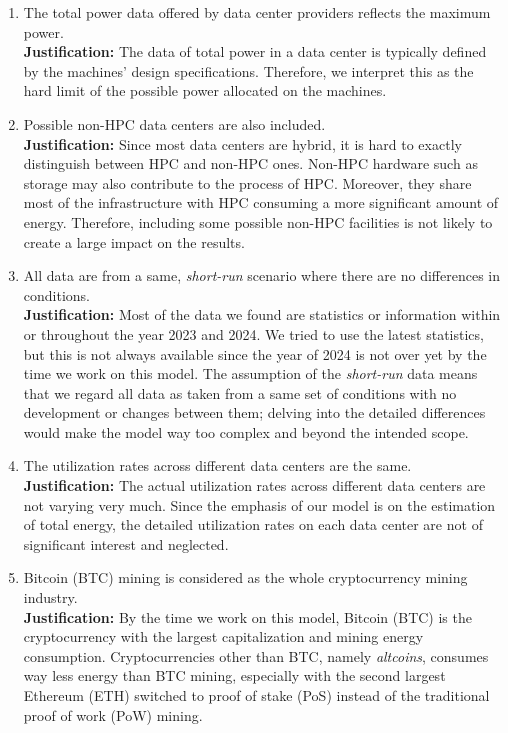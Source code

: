 \documentclass[12pt]{article}
\begin{document}
\begin{enumerate}
	\item The total power data offered by data center providers reflects the maximum power. \\
	\textbf{Justification:} The data of total power in a data center is typically defined by the machines' design specifications. Therefore, we interpret this as the hard limit of the possible power allocated on the machines.
	
	\item Possible non-HPC data centers are also included. \\
	\textbf{Justification:} Since most data centers are hybrid, it is hard to exactly distinguish between HPC and non-HPC ones. Non-HPC hardware such as storage may also contribute to the process of HPC. Moreover, they share most of the infrastructure with HPC consuming a more significant amount of energy. Therefore, including some possible non-HPC facilities is not likely to create a large impact on the results.
	
	\item All data are from a same, \textit{short-run} scenario where there are no differences in conditions. \\
	\textbf{Justification:} Most of the data we found are statistics or information within or throughout the year 2023 and 2024. We tried to use the latest statistics, but this is not always available since the year of 2024 is not over yet by the time we work on this model. The assumption of the \textit{short-run} data means that we regard all data as taken from a same set of conditions with no development or changes between them; delving into the detailed differences would make the model way too complex and beyond the intended scope.

	\item The utilization rates across different data centers are the same. \\
	\textbf{Justification:} The actual utilization rates across different data centers are not varying very much. Since the emphasis of our model is on the estimation of total energy, the detailed utilization rates on each data center are not of significant interest and neglected.

	\item Bitcoin (BTC) mining is considered as the whole cryptocurrency mining industry. \\
	\textbf{Justification:} By the time we work on this model, Bitcoin (BTC) is the cryptocurrency with the largest capitalization and mining energy consumption. Cryptocurrencies other than BTC, namely \textit{altcoins}, consumes way less energy than BTC mining, especially with the second largest Ethereum (ETH) switched to proof of stake (PoS) instead of the traditional proof of work (PoW) mining.


\end{enumerate}
\end{document}

